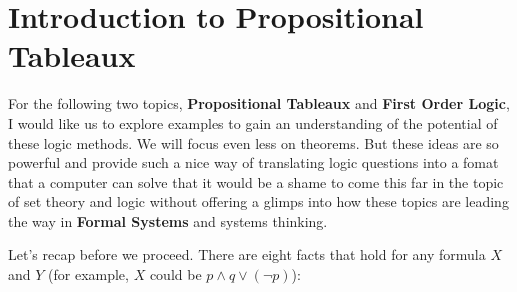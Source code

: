 \section{Introduction to Propositional Tableaux}
For the following two topics, \textbf{Propositional Tableaux} and \textbf{First Order Logic}, I would like us to explore examples to gain an understanding of the potential of these logic methods.  We will focus even less on theorems.  But these ideas are so powerful and provide such a nice way of translating logic questions into a fomat that a computer can solve that it would be a shame to come this far in the topic of set theory and logic without offering a glimps into how these topics are leading the way in \textbf{Formal Systems} and systems thinking.  

Let's recap before we proceed.  There are eight facts that hold for any formula $X$ and $Y$  (for example, $X$ could be $p\land q \lor (\neg p)$):

